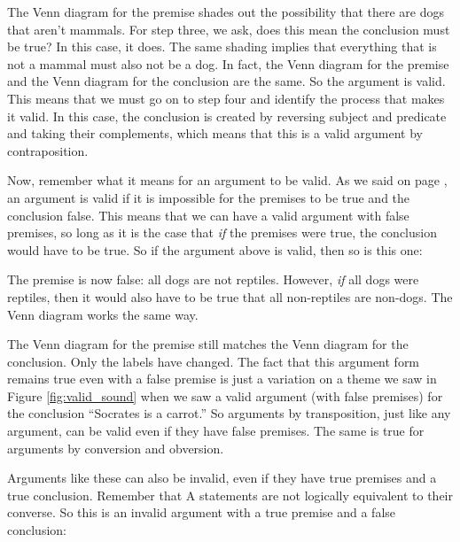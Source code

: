 The Venn diagram for the premise shades out the possibility that there are dogs that aren't mammals. For step three, we ask, does this mean the conclusion must be true?  In this case, it does. The same shading implies that everything that is not a mammal must also not be a dog. In fact, the Venn diagram for the premise and the Venn diagram for the conclusion are the same. So the argument is valid. This means that we must go on to step four and identify the process that makes it valid. In this case, the conclusion is created by reversing subject and predicate and taking their complements, which means that this is a valid argument by contraposition.

Now, remember what it means for an argument to be valid. \label{valid_definition_reinforcement} As we said on page \pageref{def:valid}, an argument is valid if it is impossible for the premises to be true and the conclusion false. This means that we can have a valid argument with false premises, so long as it is the case that \emph{if} the premises were true, the conclusion would have to be true. So if the argument above is valid, then so is this one:

\begin{kormanize}
\end{kormanize}

The premise is now false: all dogs are not reptiles. However, \emph{if} all dogs were reptiles, then it would also have to be true that all non-reptiles are non-dogs. The Venn diagram works the same way.



The Venn diagram for the premise still matches the Venn diagram for the conclusion. Only the labels have changed. The fact that this argument form remains true even with a false premise is just a variation on a theme we saw in
Figure \ref{fig:valid_sound} when we saw a valid argument (with false premises) for the conclusion ``Socrates is a carrot.'' So arguments by transposition, just like any argument, can be valid even if they have false premises. The same is true for arguments by conversion and obversion.

Arguments like these can also be invalid, even if they have true premises and a true conclusion. Remember that A statements are not logically equivalent to their converse. So this is an invalid argument with a true premise and a false conclusion:

\begin{kormanize}
\end{kormanize}

